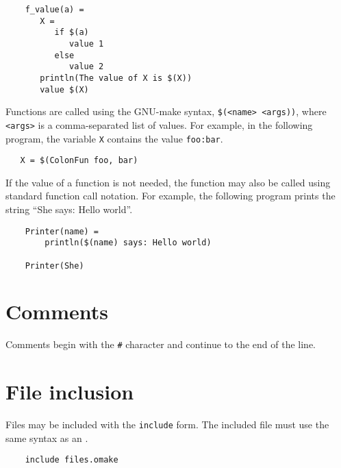 \begin{verbatim}
    f_value(a) =
       X =
          if $(a)
             value 1
          else
             value 2
       println(The value of X is $(X))
       value $(X)
\end{verbatim}

Functions are called using the GNU-make syntax, \verb+$(<name> <args))+,
where \verb+<args>+ is a comma-separated list of values.  For example,
in the following program, the variable \verb+X+ contains the
value \verb+foo:bar+.

\begin{verbatim}
   X = $(ColonFun foo, bar)
\end{verbatim}

If the value of a function is not needed, the function may also be called
using standard function call notation.  For example, the following program
prints the string ``She says: Hello world''.

\begin{verbatim}
    Printer(name) =
        println($(name) says: Hello world)

    Printer(She)
\end{verbatim}

\section{Comments}

Comments begin with the \verb+#+ character and continue to the end of the line.

\section{File inclusion}
\label{section:include}

Files may be included with the \verb+include+ form.  The included file must use
the same syntax as an .

\begin{verbatim}
    include files.omake
\end{verbatim}


%
%

